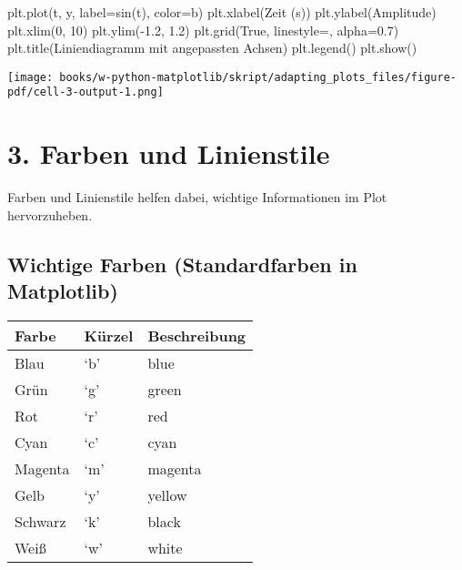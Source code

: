 \documentclass[
  letterpaper,
  DIV=11,
  numbers=noendperiod]{scrreprt}
\newenvironment{Shaded}{\begin{snugshade}}{\end{snugshade}}
\newcommand{\DecValTok}[1]{\textcolor[rgb]{0.68,0.00,0.00}{#1}}
\newcommand{\FloatTok}[1]{\textcolor[rgb]{0.68,0.00,0.00}{#1}}
\newcommand{\NormalTok}[1]{\textcolor[rgb]{0.00,0.23,0.31}{#1}}
\newcommand{\OperatorTok}[1]{\textcolor[rgb]{0.37,0.37,0.37}{#1}}
\newcommand{\StringTok}[1]{\textcolor[rgb]{0.13,0.47,0.30}{#1}}
\newcommand{\VariableTok}[1]{\textcolor[rgb]{0.07,0.07,0.07}{#1}}
\begin{document}
\begin{tcolorbox}
\begin{Shaded}
\begin{Highlighting}[]
\NormalTok{plt.plot(t, y, label}\OperatorTok{=}\StringTok{\textquotesingle{}sin(t)\textquotesingle{}}\NormalTok{, color}\OperatorTok{=}\StringTok{\textquotesingle{}b\textquotesingle{}}\NormalTok{)}
\NormalTok{plt.xlabel(}\StringTok{\textquotesingle{}Zeit (s)\textquotesingle{}}\NormalTok{)}
\NormalTok{plt.ylabel(}\StringTok{\textquotesingle{}Amplitude\textquotesingle{}}\NormalTok{)}
\NormalTok{plt.xlim(}\DecValTok{0}\NormalTok{, }\DecValTok{10}\NormalTok{)}
\NormalTok{plt.ylim(}\OperatorTok{{-}}\FloatTok{1.2}\NormalTok{, }\FloatTok{1.2}\NormalTok{)}
\NormalTok{plt.grid(}\VariableTok{True}\NormalTok{, linestyle}\OperatorTok{=}\StringTok{\textquotesingle{}{-}{-}\textquotesingle{}}\NormalTok{, alpha}\OperatorTok{=}\FloatTok{0.7}\NormalTok{)}
\NormalTok{plt.title(}\StringTok{\textquotesingle{}Liniendiagramm mit angepassten Achsen\textquotesingle{}}\NormalTok{)}
\NormalTok{plt.legend()}
\NormalTok{plt.show()}
\end{Highlighting}
\end{Shaded}

\texttt{[image: books/w-python-matplotlib/skript/adapting\_plots\_files/figure-pdf/cell-3-output-1.png]}

\section{3. Farben und Linienstile}\label{farben-und-linienstile}

Farben und Linienstile helfen dabei, wichtige Informationen im Plot
hervorzuheben.

\subsection{Wichtige Farben (Standardfarben in
Matplotlib)}\label{wichtige-farben-standardfarben-in-matplotlib}

\begin{longtable}[]{@{}lll@{}}
\toprule\noalign{}
Farbe & Kürzel & Beschreibung \\
\midrule\noalign{}
\endhead
\bottomrule\noalign{}
\endlastfoot
Blau & `b' & blue \\
Grün & `g' & green \\
Rot & `r' & red \\
Cyan & `c' & cyan \\
Magenta & `m' & magenta \\
Gelb & `y' & yellow \\
Schwarz & `k' & black \\
Weiß & `w' & white \\
\end{longtable}


\end{tcolorbox}
\end{document}
